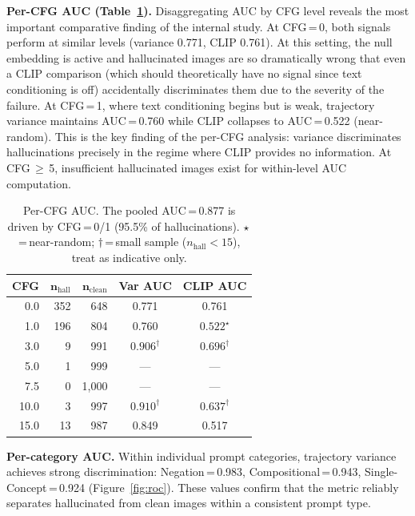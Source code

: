 \documentclass[conference]{IEEEtran}
\begin{document}
\textbf{Per-CFG AUC (Table~\ref{tab:cfg_auc}).} Disaggregating AUC
by CFG level reveals the most important comparative finding of the
internal study. At CFG\,=\,0, both signals perform at similar levels
(variance 0.771, CLIP 0.761). At this setting, the null embedding
is active and hallucinated images are so dramatically wrong that even
a CLIP comparison (which should theoretically have no signal since
text conditioning is off) accidentally discriminates them due to
the severity of the failure. At CFG\,=\,1, where text conditioning
begins but is weak, trajectory variance maintains AUC\,=\,0.760
while CLIP collapses to AUC\,=\,0.522 (near-random). This is the
key finding of the per-CFG analysis: variance discriminates
hallucinations precisely in the regime where CLIP provides no
information. At CFG\,${\geq}$\,5, insufficient hallucinated images
exist for within-level AUC computation.

\begin{table}[h]
\centering
\caption{Per-CFG AUC. The pooled AUC\,=\,0.877 is driven by
CFG\,=\,0/1 (95.5\% of hallucinations).
$\star$\,=\,near-random; $\dagger$\,=\,small sample
($n_\text{hall}{<}15$), treat as indicative only.}
\label{tab:cfg_auc}
\small
\begin{tabular}{rrrcc}
\toprule
\textbf{CFG} & $\boldsymbol{n}_\text{hall}$ & $\boldsymbol{n}_\text{clean}$
& \textbf{Var AUC} & \textbf{CLIP AUC} \\
\midrule
0.0  & 352 & 648 & 0.771 & 0.761 \\
1.0  & 196 & 804 & 0.760 & $0.522^\star$ \\
3.0  &   9 & 991 & $0.906^\dagger$ & $0.696^\dagger$ \\
5.0  &   1 & 999 & --- & --- \\
7.5  &   0 & 1{,}000 & --- & --- \\
10.0 &   3 & 997 & $0.910^\dagger$ & $0.637^\dagger$ \\
15.0 &  13 & 987 & 0.849 & 0.517 \\
\bottomrule
\end{tabular}
\end{table}

\textbf{Per-category AUC.} Within individual prompt categories,
trajectory variance achieves strong discrimination: Negation\,=\,0.983,
Compositional\,=\,0.943, Single-Concept\,=\,0.924 (Figure~\ref{fig:roc}).
These values confirm that the metric reliably separates hallucinated
from clean images within a consistent prompt type.
\end{document}
